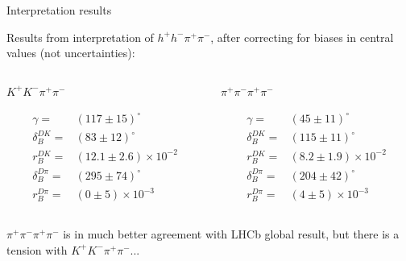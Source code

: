 \documentclass[xcolor={dvipsnames}]{beamer}
\begin{document}
\begin{frame}{Interpretation results}
  \begin{center}
    {\large Results from interpretation of $h^+h^-\pi^+\pi^-$, after correcting for biases in central values (not uncertainties):}
  \end{center}
  \vspace{-0.5cm}
  \begin{columns}
    \begin{column}{0.5\textwidth}
      \begin{center}
        $K^+K^-\pi^+\pi^-$
      \end{center}
      \begin{align*}
        \gamma =& (117 \pm 15)^\circ \\
        \delta_B^{DK} =& (83 \pm 12)^\circ \\
        r_B^{DK} =& (12.1 \pm 2.6)\times10^{-2} \\
        \delta_B^{D\pi} =& (295 \pm 74)^\circ \\
        r_B^{D\pi} =& (0 \pm 5)\times10^{-3}
      \end{align*}
    \end{column}
    \begin{column}{0.5\textwidth}
      \begin{center}
        $\pi^+\pi^-\pi^+\pi^-$
      \end{center}
      \begin{align*}
        \gamma =& (45 \pm 11)^\circ \\
        \delta_B^{DK} =& (115 \pm 11)^\circ \\
        r_B^{DK} =& (8.2 \pm 1.9)\times10^{-2} \\
        \delta_B^{D\pi} =& (204 \pm 42)^\circ \\
        r_B^{D\pi} =& (4 \pm 5)\times10^{-3}
      \end{align*}
    \end{column}
  \end{columns}
  \vspace{0.3cm}
  \begin{center}
    $\pi^+\pi^-\pi^+\pi^-$ is in much better agreement with LHCb global result, but there is a tension with $K^+K^-\pi^+\pi^-$...\\
    \phantom{...but how Gaussian are these uncertainties?}
  \end{center}
\end{frame}
\end{document}
